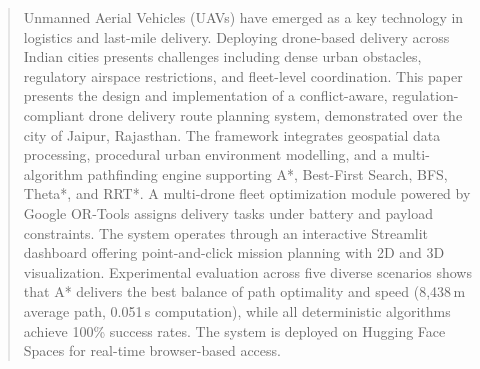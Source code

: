 \documentclass[11pt,a4paper,twocolumn]{article}
\begin{document}

\begin{abstract}
Unmanned Aerial Vehicles (UAVs) have emerged as a key technology in logistics and last-mile delivery. 
Deploying drone-based delivery across Indian cities presents challenges including dense urban obstacles, regulatory airspace restrictions, and fleet-level coordination. 
This paper presents the design and implementation of a conflict-aware, regulation-compliant drone delivery route planning system, demonstrated over the city of Jaipur, Rajasthan. 
The framework integrates geospatial data processing, procedural urban environment modelling, and a multi-algorithm pathfinding engine supporting A*, Best-First Search, BFS, Theta*, and RRT*. 
A multi-drone fleet optimization module powered by Google OR-Tools assigns delivery tasks under battery and payload constraints. 
The system operates through an interactive Streamlit dashboard offering point-and-click mission planning with 2D and 3D visualization. 
Experimental evaluation across five diverse scenarios shows that A* delivers the best balance of path optimality and speed (8,438\,m average path, 0.051\,s computation), while all deterministic algorithms achieve 100\% success rates. 
The system is deployed on Hugging Face Spaces for real-time browser-based access.
\end{abstract}
\end{document}
